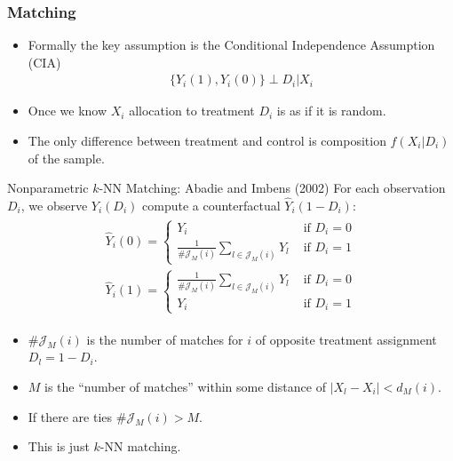 \documentclass[aspectratio=169,11pt]{beamer}
\begin{document}
\begin{frame}
\frametitle{Matching}
\begin{itemize}
\item Formally the key assumption is the \alert{Conditional Independence Assumption (CIA)}
\begin{eqnarray*}
\{Y_i(1),Y_i(0)\}  \perp D_i | X_i
\end{eqnarray*}
\item Once we know $X_i$ allocation to treatment $D_i$ is as if it is random.
\item The only difference between treatment and control is composition $f(X_i | D_i)$ of the sample.
\end{itemize}
\end{frame}





\begin{frame}{Nonparametric $k$-NN Matching: Abadie and Imbens (2002)}
For each observation $D_i$, we observe $Y_i(D_i)$ compute a \alert{counterfactual} $\hat{Y}_i(1-D_i)$:
\begin{align*}
\begin{array}{l}
\widehat{Y}_{i}(0)=\left\{\begin{array}{cl}
Y_{i} & \text { if } D_{i}=0 \\
\frac{1}{\# \mathcal{J}_{M}(i)} \sum_{l \in \mathcal{J}_{M}(i)} Y_{l} & \text { if } D_{i}=1
\end{array}\right. \\
\widehat{Y}_{i}(1)=\left\{\begin{array}{cc}
\frac{1}{\# \mathcal{J}_{M}(i)} \sum_{l \in \mathcal{J}_{M}(i)} Y_{l} & \text { if } D_{i}=0 \\
Y_{i} & \text { if } D_{i}=1
\end{array}\right.
\end{array}
\end{align*}
\begin{itemize}
\item $\# \mathcal{J}_{M}(i)$ is the number of matches for $i$ of opposite treatment assignment $D_l =1-D_i$.
\item $M$ is the ``number of matches'' within some distance of $|X_l -X_i|< d_M(i)$.
\item If there are ties $\# \mathcal{J}_{M}(i) > M$.
\item This is just $k$-NN matching.
\end{itemize}
\end{frame}
\end{document}

